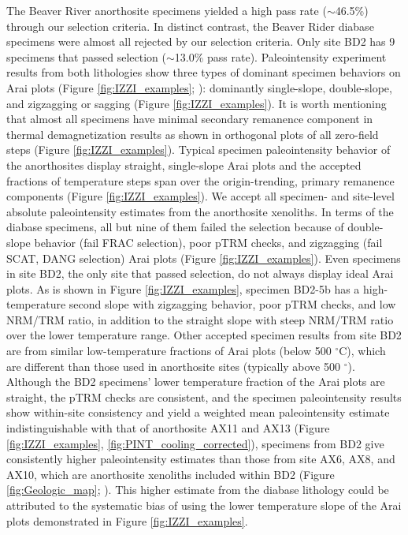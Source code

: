 \documentclass[draft]{agujournal2019}
\begin{document}
The Beaver River anorthosite specimens yielded a high pass rate ($\sim$46.5\%) through our selection criteria. In distinct contrast, the Beaver Rider diabase specimens were almost all rejected by our selection criteria. Only site BD2 has 9 specimens that passed selection ($\sim$13.0\% pass rate). Paleointensity experiment results from both lithologies show three types of dominant specimen behaviors on Arai plots (Figure \ref{fig:IZZI_examples}; ): dominantly single-slope, double-slope, and zigzagging or sagging (Figure \ref{fig:IZZI_examples}). It is worth mentioning that almost all specimens have minimal secondary remanence component in thermal demagnetization results as shown in orthogonal plots of all zero-field steps (Figure \ref{fig:IZZI_examples}). Typical specimen paleointensity behavior of the anorthosites display straight, single-slope Arai plots and the accepted fractions of temperature steps span over the origin-trending, primary remanence components (Figure \ref{fig:IZZI_examples}). We accept all specimen- and site-level absolute paleointensity estimates from the anorthosite xenoliths. In terms of the diabase specimens, all but nine of them failed the selection because of double-slope behavior (fail FRAC selection), poor pTRM checks, and zigzagging (fail SCAT, DANG selection) Arai plots (Figure \ref{fig:IZZI_examples}). Even specimens in site BD2, the only site that passed selection, do not always display ideal Arai plots. As is shown in Figure \ref{fig:IZZI_examples}, specimen BD2-5b has a high-temperature second slope with zigzagging behavior, poor pTRM checks, and low NRM/TRM ratio, in addition to the straight slope with steep NRM/TRM ratio over the lower temperature range. Other accepted specimen results from site BD2 are from similar low-temperature fractions of Arai plots (below 500 $^\circ$C), which are different than those used in anorthosite sites (typically above 500 $^\circ$). Although the BD2 specimens' lower temperature fraction of the Arai plots are straight, the pTRM checks are consistent, and the specimen paleointensity results show within-site consistency and yield a weighted mean paleointensity estimate indistinguishable with that of anorthosite AX11 and AX13 (Figure \ref{fig:IZZI_examples}, \ref{fig:PINT_cooling_corrected}), specimens from BD2 give consistently higher paleointensity estimates than those from site AX6, AX8, and AX10, which are anorthosite xenoliths included within BD2 (Figure \ref{fig:Geologic_map}; ). This higher estimate from the diabase lithology could be attributed to the systematic bias of using the lower temperature slope of the Arai plots demonstrated in Figure \ref{fig:IZZI_examples}. 
\end{document}
